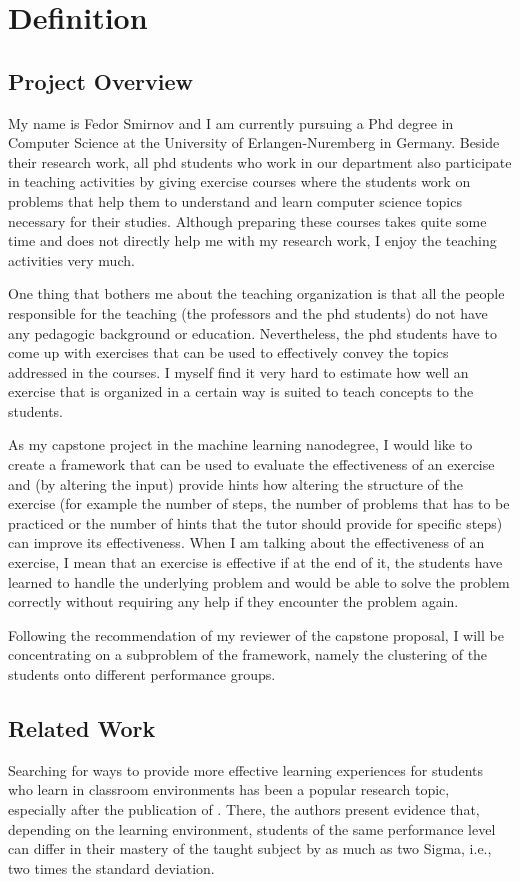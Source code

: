 \section{Definition}

\subsection{Project Overview}

My name is Fedor Smirnov and I am currently pursuing a Phd degree in Computer Science at the University of Erlangen-Nuremberg in Germany. Beside their research work, all phd students who work in our department also participate in teaching activities by giving exercise courses where the students work on problems that help them to understand and learn computer science topics necessary for their studies. Although preparing these courses takes quite some time and does not directly help me with my research work, I enjoy the teaching activities very much.

One thing that bothers me about the teaching organization is that all the people responsible for the teaching (the professors and the phd students) do not have any pedagogic background or education. Nevertheless, the phd students have to come up with exercises that can be used to effectively convey the topics addressed in the courses. I myself find it very hard to estimate how well an exercise that is organized in a certain way is suited to teach concepts to the students.

As my capstone project in the machine learning nanodegree, I would like to create a framework that can be used to evaluate the effectiveness of an exercise and (by altering the input) provide hints how altering the structure of the exercise (for example the number of steps, the number of problems that has to be practiced or the number of hints that the tutor should provide for specific steps) can improve its effectiveness. When I am talking about the effectiveness of an exercise, I mean that an exercise is effective if at the end of it, the students have learned to handle the underlying problem and would be able to solve the problem correctly without requiring any help if they encounter the problem again.

Following the recommendation of my reviewer of the capstone proposal, I will be concentrating on a subproblem of the framework, namely the clustering of the students onto different performance groups. 


\subsection{Related Work}
Searching for ways to provide more effective learning experiences for students who learn in classroom environments has been a popular research topic, especially after the publication of \cite{2sigma}. There, the authors present evidence that, depending on the learning environment, students of the same performance level can differ in their mastery of the taught subject by as much as two Sigma, i.e., two times the standard deviation.

